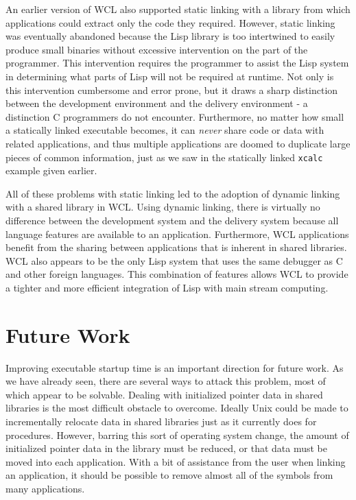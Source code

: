 An earlier version of WCL also supported static linking with a library
from which applications could extract only the code they required.
However, static linking was eventually abandoned because the Lisp
library is too intertwined to easily produce small binaries without
excessive intervention on the part of the programmer. This
intervention requires the programmer to assist the Lisp system in
determining what parts of Lisp will not be required at runtime.  Not
only is this intervention cumbersome and error prone, but it draws a
sharp distinction between the development environment and the delivery
environment - a distinction C programmers do not encounter.
Furthermore, no matter how small a statically linked executable
becomes, it can {\it never} share code or data with related
applications, and thus multiple applications are doomed to duplicate
large pieces of common information, just as we saw in the statically
linked {\tt xcalc} example given earlier.

All of these problems with static linking led to the adoption of
dynamic linking with a shared library in WCL. Using dynamic linking,
there is virtually no difference between the development system and
the delivery system because all language features are available to an
application. Furthermore, WCL applications benefit from the sharing
between applications that is inherent in shared libraries.  WCL also
appears to be the only Lisp system that uses the same debugger as C
and other foreign languages.  This combination of features allows WCL
to provide a tighter and more efficient integration of Lisp with main
stream computing.

\section{Future Work}

Improving executable startup time is an important direction for future
work. As we have already seen, there are several ways to attack this
problem, most of which appear to be solvable.  Dealing with initialized
pointer data in shared libraries is the most difficult obstacle to
overcome.  Ideally Unix could be made to incrementally relocate data
in shared libraries just as it currently does for procedures. However,
barring this sort of operating system change, the amount of
initialized pointer data in the library must be reduced, or that data
must be moved into each application. With a bit of assistance from the
user when linking an application, it should be possible to remove
almost all of the symbols from many applications. 

